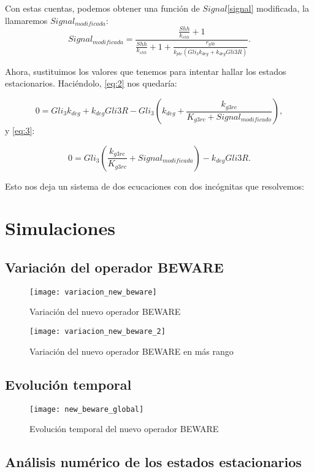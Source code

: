 Con estas cuentas, podemos obtener una función de $Signal$\ref{signal} modificada, la llamaremos $Signal_{modificada}$:
 \begin{equation}
 Signal_{modificada}=\frac{\frac{Shh}{k_{shh}} + 1}{\frac{Shh}{k_{shh}} + 1 + \frac{r_{g3b}}{k_{ptc}(Gli_3k_{deg}+k_{deg}Gli3R)}}.
 \end{equation}
 
Ahora, sustituimos los valores que tenemos para intentar hallar los estados estacionarios. Haciéndolo, \ref{eq:2} nos quedaría:

\begin{equation}
0 = Gli_3k_{deg}+k_{deg}Gli3R-Gli_3\left(k_{deg}+\frac{k_{g3rc}}{K_{g3rc}+Signal_{modificado}}\right),
\label{eq:2-modified}
\end{equation}
y \ref{eq:3}:

\begin{equation}
0=Gli_3\left(\frac{k_{g3rc}}{K_{g3rc}}+Signal_{modificada}\right)-k_{deg}Gli3R.
	\label{eq:3-modified}
\end{equation}

Esto nos deja un sistema de dos ecucaciones con dos incógnitas que resolvemos:




\section{Simulaciones}

\subsection{Variación del operador BEWARE}

\begin{figure}[h]
	\texttt{[image: variacion\_new\_beware]}
	\centering
	\caption{Variación del nuevo operador BEWARE }
	\label{vari_beware}
\end{figure}

\begin{figure}[h]
	\texttt{[image: variacion\_new\_beware\_2]}
	\centering
	\caption{Variación del nuevo operador BEWARE en más rango}
	\label{vari_beware_2}
\end{figure}

\subsection{Evolución temporal}

\begin{figure}[h]
	\texttt{[image: new\_beware\_global]}
	\centering
	\caption{Evolución temporal del nuevo operador BEWARE}
	\label{evolu_beware}
\end{figure}

\subsection{Análisis numérico de los estados estacionarios}


